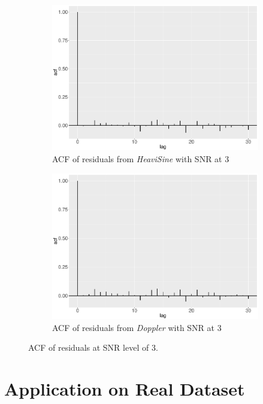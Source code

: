 \begin{figure}
\begin{subfigure}{0.45\textwidth}
    \includegraphics[width=\textwidth]{Chapters/02TractorSplineTheory/plot/ggplot/ggacfHeavi3.pdf}
    \caption{ACF of residuals from \textit{HeaviSine} with SNR at 3 }
    \end{subfigure}
    \begin{subfigure}{0.45\textwidth}
    \centering
    \includegraphics[width=\textwidth]{Chapters/02TractorSplineTheory/plot/ggplot/ggacfDoppler3.pdf}
    \caption{ACF of residuals from \textit{Doppler} with SNR at 3 }
    \end{subfigure}
\caption{ACF of residuals at SNR level of 3.}\label{tractorsplineSNR3acf}
 \end{figure}



\section{Application on Real Dataset}\label{splineapplication}

